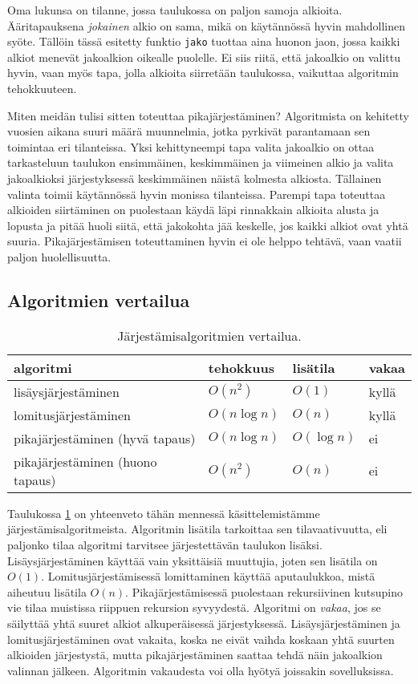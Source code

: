Oma lukunsa on tilanne, jossa taulukossa on paljon samoja alkioita.
Ääritapauksena \emph{jokainen} alkio on sama,
mikä on käytännössä hyvin mahdollinen syöte.
Tällöin tässä esitetty funktio \texttt{jako} tuottaa aina huonon jaon,
jossa kaikki alkiot menevät jakoalkion oikealle puolelle.
Ei siis riitä, että jakoalkio on valittu hyvin,
vaan myös tapa, jolla alkioita siirretään taulukossa,
vaikuttaa algoritmin tehokkuuteen.

Miten meidän tulisi sitten toteuttaa pikajärjestäminen?
Algoritmista on kehitetty vuosien aikana suuri määrä muunnelmia,
jotka pyrkivät parantamaan sen toimintaa eri tilanteissa.
Yksi kehittyneempi tapa valita jakoalkio on ottaa tarkasteluun
taulukon ensimmäinen, keskimmäinen ja viimeinen alkio ja valita
jakoalkioksi järjestyksessä keskimmäinen näistä kolmesta alkiosta.
Tällainen valinta toimii käytännössä hyvin monissa tilanteissa.
Parempi tapa toteuttaa alkioiden siirtäminen on puolestaan
käydä läpi rinnakkain alkioita alusta ja lopusta ja
pitää huoli siitä, että jakokohta jää keskelle, jos kaikki alkiot
ovat yhtä suuria.
Pikajärjestämisen toteuttaminen hyvin ei ole helppo tehtävä,
vaan vaatii paljon huolellisuutta.

\subsection{Algoritmien vertailua}

\begin{table}
\center
\begin{tabular}{llll}
algoritmi & tehokkuus & lisätila & vakaa \\
\hline
lisäysjärjestäminen & $O(n^2)$ & $O(1)$ & kyllä \\
lomitusjärjestäminen & $O(n \log n)$ & $O(n)$ & kyllä \\
pikajärjestäminen (hyvä tapaus) & $O(n \log n)$ & $O(\log n)$ & ei \\
pikajärjestäminen (huono tapaus) & $O(n^2)$ & $O(n)$ & ei \\
\end{tabular}
\caption{Järjestämisalgoritmien vertailua.}
\label{tab:jaralg}
\end{table}


Taulukossa \ref{tab:jaralg} on yhteenveto tähän mennessä
käsittelemistämme järjestämis\-algoritmeista.
Algoritmin lisätila tarkoittaa sen tilavaativuutta,
eli paljonko tilaa algoritmi tarvitsee järjestettävän taulukon lisäksi.
Lisäysjärjestäminen käyttää vain yksittäisiä muuttujia,
joten sen lisätila on $O(1)$.
Lomitusjärjes\-tämisessä lomittaminen käyttää aputaulukkoa,
mistä aiheutuu lisätila $O(n)$.
Pikajärjestämisessä puolestaan rekursiivinen kutsupino
vie tilaa muistissa riippuen rekursion syvyydestä.
Algoritmi on \emph{vakaa}, jos se säilyttää yhtä suuret alkiot
alkuperäisessä järjestyksessä.
Lisäysjärjestäminen ja lomitusjärjes\-täminen ovat vakaita,
koska ne eivät vaihda koskaan yhtä suurten alkioiden järjestystä,
mutta pikajärjestäminen saattaa tehdä näin jakoalkion valinnan jälkeen.
Algoritmin vakaudesta voi olla hyötyä joissakin sovelluksissa.

